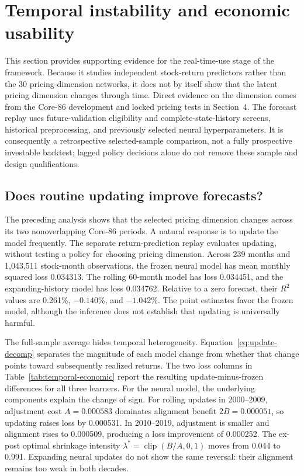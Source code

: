\section{Temporal instability and economic usability}

This section provides supporting evidence for the real-time-use stage of the framework. Because it studies independent stock-return predictors rather than the 30 pricing-dimension networks, it does not by itself show that the latent pricing dimension changes through time. Direct evidence on the dimension comes from the Core-86 development and locked pricing tests in Section~4. The forecast replay uses future-validation eligibility and complete-state-history screens, historical preprocessing, and previously selected neural hyperparameters. It is consequently a retrospective selected-sample comparison, not a fully prospective investable backtest; lagged policy decisions alone do not remove these sample and design qualifications.

\subsection{Does routine updating improve forecasts?}

The preceding analysis shows that the selected pricing dimension changes across its two nonoverlapping Core-86 periods. A natural response is to update the model frequently. The separate return-prediction replay evaluates updating, without testing a policy for choosing pricing dimension. Across 239 months and 1,043,511 stock-month observations, the frozen neural model has mean monthly squared loss 0.034313. The rolling 60-month model has loss 0.034451, and the expanding-history model has loss 0.034762. Relative to a zero forecast, their $R^2$ values are 0.261\%, $-0.140$\%, and $-1.042$\%. The point estimates favor the frozen model, although the inference does not establish that updating is universally harmful.

The full-sample average hides temporal heterogeneity. Equation~\eqref{eq:update-decomp} separates the magnitude of each model change from whether that change points toward subsequently realized returns. The two loss columns in Table~\ref{tab:temporal-economic} report the resulting update-minus-frozen differences for all three learners. For the neural model, the underlying components explain the change of sign. For rolling updates in 2000--2009, adjustment cost $A=0.000583$ dominates alignment benefit $2B=0.000051$, so updating raises loss by 0.000531. In 2010--2019, adjustment is smaller and alignment rises to 0.000509, producing a loss improvement of 0.000252. The ex-post optimal shrinkage intensity $\lambda^*=\operatorname{clip}(B/A,0,1)$ moves from 0.044 to 0.991. Expanding neural updates do not show the same reversal: their alignment remains too weak in both decades.

